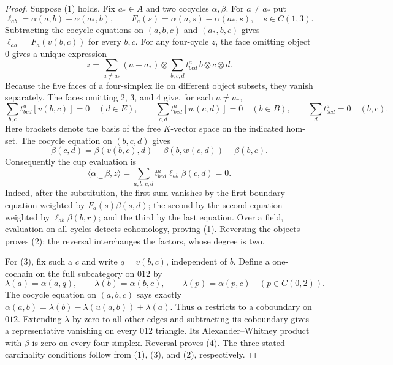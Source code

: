 \begin{proof}
Suppose (1) holds. Fix $a_*\in A$ and two cocycles $\alpha,\beta$.
For $a\ne a_*$ put
\[
 \ell_{ab}=\alpha(a,b)-\alpha(a_*,b),\qquad
 F_a(s)=\alpha(a,s)-\alpha(a_*,s),\quad s\in C(1,3).
\]
Subtracting the cocycle equations on $(a,b,c)$ and $(a_*,b,c)$
gives $\ell_{ab}=F_a(v(b,c))$ for every $b,c$.
For any four-cycle $z$, the face omitting object $0$ gives a unique
expression
\[
 z=\sum_{a\ne a_*}(a-a_*)\otimes
       \sum_{b,c,d}t^a_{bcd}\,b\otimes c\otimes d.
\]
Because the five faces of a four-simplex lie on different object
subsets, they vanish separately. The faces omitting $2$, $3$, and
$4$ give, for each $a\ne a_*$,
\[
 \sum_{b,c}t^a_{bcd}[v(b,c)]=0\quad(d\in E),\qquad
 \sum_{c,d}t^a_{bcd}[w(c,d)]=0\quad(b\in B),\qquad
 \sum_dt^a_{bcd}=0\quad(b,c).
\]
Here brackets denote the basis of the free $K$-vector space on the
indicated hom-set. The cocycle equation on $(b,c,d)$ gives
\[
 \beta(c,d)=\beta(v(b,c),d)-\beta(b,w(c,d))+\beta(b,c).
\]
Consequently the cup evaluation is
\[
 \langle\alpha\smile\beta,z\rangle
   =\sum_{a,b,c,d}t^a_{bcd}\ell_{ab}\beta(c,d)=0.
\]
Indeed, after the substitution, the first sum vanishes by the first
boundary equation weighted by $F_a(s)\beta(s,d)$; the second by
the second equation weighted by $\ell_{ab}\beta(b,r)$; and the
third by the last equation. Over a field, evaluation on all cycles
detects cohomology, proving (1). Reversing the objects proves (2);
the reversal interchanges the factors, whose degree is two.

For (3), fix such a $c$ and write $q=v(b,c)$, independent of $b$.
Define a one-cochain on the full subcategory on $012$ by
\[
 \lambda(a)=\alpha(a,q),\qquad
 \lambda(b)=\alpha(b,c),\qquad
 \lambda(p)=\alpha(p,c)\quad(p\in C(0,2)).
\]
The cocycle equation on $(a,b,c)$ says exactly
$\alpha(a,b)=\lambda(b)-\lambda(u(a,b))+\lambda(a)$.
Thus $\alpha$ restricts to a coboundary on $012$. Extending
$\lambda$ by zero to all other edges and subtracting its coboundary
gives a representative vanishing on every $012$ triangle. Its
Alexander--Whitney product with $\beta$ is zero on every
four-simplex. Reversal proves (4). The three stated cardinality
conditions follow from (1), (3), and (2), respectively.
\end{proof}

